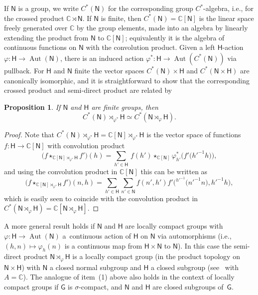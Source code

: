 \documentclass[pdftex]{sigma}
\numberwithin{equation}{section}
\newcommand{\sfG}{\mathsf{G}}
\newcommand{\sfH}{\mathsf{H}}
\newcommand{\sfN}{\mathsf{N}}
\newcommand{\Aut}{\operatorname{Aut}}
\newcommand{\complex}{{\mathbb C}} %
\newtheorem{Proposition}[Theorem]{Proposition}
 { \theoremstyle{definition}
\newtheorem{Definition}[Theorem]{Definition}
\newtheorem{Note}[Theorem]{Note}
\newtheorem{Example}[Theorem]{Example}
\newtheorem{Remark}[Theorem]{Remark} }
\begin{document}
If $\sfN $ is a group, we write $C^*(\sfN )$ for the corresponding group
$C^*$-algebra, i.e., for the crossed product $\complex\rtimes \sfN $. If
$\sfN $ is finite, then $C^*(\sfN )=\complex[\sfN ]$ is the linear space
freely generated over $\complex$ by the group elements, made into an algebra by
linearly extending the product from $\sfN $ to $\complex[\sfN ]$; equivalently
it is the algebra of continuous functions
on $\sfN $ with the convolution product.
 Given a
left $\sfH $-action $\varphi\colon \sfH \to\Aut(\sfN )$, there is an induced action
$\varphi^*\colon \sfH \to \Aut(C^*(\sfN ))$ via pullback. For $\sfH $ and $\sfN $ finite the
vector spaces $ C^*(\sfN )\times \sfH $ and $C^*(\sfN \times \sfH )$ are canonically
isomorphic, and it is straightforward
to show that the corresponding crossed product and semi-direct product are
related by
\begin{Proposition}\label{cpsp}
If $\sfN$ and $\sfH$ are finite groups, then
\[
C^*(\sfN )\rtimes_{\varphi^*}\sfH \simeq C^*(\sfN \rtimes_\varphi \sfH ) .
\]
\end{Proposition}
\begin{proof} Note that $C^*(\sfN )\rtimes_{\varphi^*}\sfH =\complex[\sfN ]\rtimes_{\varphi^*}\sfH $ is the
 vector space of functions $f\colon \sfH \to \complex[\sfN ]$ with convolution product
\[
\big(f\star_{\complex[\sfN ]\rtimes_{\varphi^*}\sfH } f'\big)(h)=\sum_{h'\in
 \sfH }\,f(h')\star_{\complex[\sfN ]}\varphi^*_{h'}\big(f'\big(h'^{-1} h\big)\big) ,
\]
and using the convolution product in $\complex[\sfN]$ this can be
written as
\[
\big(f\star_{\complex[\sfN ]\rtimes_{\varphi^*}\sfH }
f'\big)(n,h)=\sum_{h'\in \sfH} \sum_{n'\in
 \sfN } f(n',h') f'\big({}^{h'^{-1\!}}\big(n'^{-1} n\big),h'^{-1} h\big) ,
\]
which is easily seen
 to coincide with the convolution product in $ C^*(\sfN \rtimes_\varphi \sfH )=\complex[\sfN \rtimes_\varphi \sfH ]$.
\end{proof}

A more general result holds if $\sfN $ and $\sfH $ are locally compact groups with $\varphi\colon \sfH \to \Aut (\sfN )$
a~continuous action of $\sfH $ on $\sfN $ via automorphisms
(i.e., $(h,n)\mapsto \varphi_h(n)$ is a continuous map from $\sfH \times \sfN $ to $\sfN $).
In this case the semi-direct product $\sfN \rtimes_\varphi \sfH $ is a locally compact
group (in the product topology on $\sfN \times \sfH $) with $\sfN $ a closed normal subgroup and $\sfH $ a closed
subgroup (see~\cite[Proposition~3.11]{Williams2007} with
$A=\complex$). The analogue of item~(1) above also holds in the
context of locally compact groups if $\sfG$ is $\sigma$-compact, and
$\sfN$ and $\sfH$ are closed subgroups of~$\sfG$.
\end{document}
